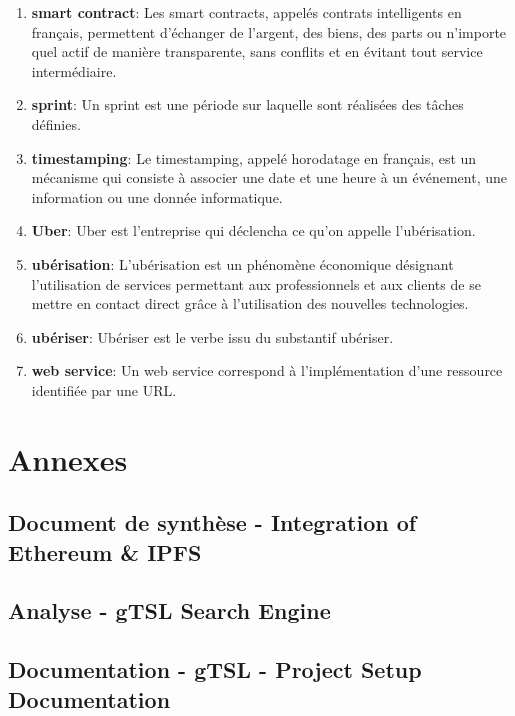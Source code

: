 \documentclass{tnreport}
\begin{document}
\begin{enumerate}
	\item \textbf{smart contract}: Les smart contracts, appelés contrats intelligents en français, permettent d'échanger de l'argent, des biens, des parts ou n'importe quel actif de manière transparente, sans conflits et en évitant tout service intermédiaire.
	\item \textbf{sprint}: Un sprint est une période sur laquelle sont réalisées des tâches définies.
	\item \textbf{timestamping}: Le timestamping, appelé horodatage en français, est un mécanisme qui consiste à associer une date et une heure à un événement, une information ou une donnée informatique.
	\item \textbf{Uber}: Uber est l'entreprise qui déclencha ce qu'on appelle l'ubérisation.
	\item \textbf{ubérisation}: L'ubérisation est un phénomène économique désignant l'utilisation de services permettant aux professionnels et aux clients de se mettre en contact direct grâce à l'utilisation des nouvelles technologies.
	\item \textbf{ubériser}: Ubériser est le verbe issu du substantif ubériser.
	\item \textbf{web service}: Un web service correspond à l'implémentation d'une ressource identifiée par une URL.
\end{enumerate}

\cleardoublepage
\renewcommand{\thesubsection}{\Roman{subsection}}

\appendix
\part*{Annexes}
\clearpage

\chapter{Document de synthèse - Integration of Ethereum \& IPFS}
\label{anx:ipfs-ethereum}

\clearpage

\chapter{Analyse - gTSL Search Engine}
\label{anx:gtsl-search-engine}

\clearpage

\chapter{Documentation - gTSL - Project Setup Documentation}
\label{anx:gtsl-setup}

\clearpage
\end{document}
